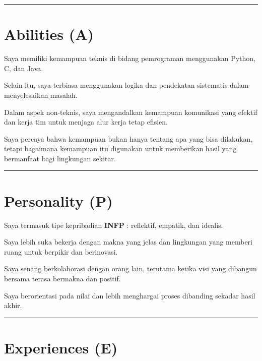 \documentclass[
  letterpaper,
  DIV=11,
  numbers=noendperiod]{scrreprt}
\begin{document}
\begin{center}\rule{0.5\linewidth}{0.5pt}\end{center}

\section*{Abilities (A)}\label{abilities-a}


Saya memiliki kemampuan teknis di bidang pemrograman menggunakan Python,
C, dan Java.

Selain itu, saya terbiasa menggunakan logika dan pendekatan sistematis
dalam menyelesaikan masalah.

Dalam aspek non-teknis, saya mengandalkan kemampuan komunikasi yang
efektif dan kerja tim untuk menjaga alur kerja tetap efisien.

Saya percaya bahwa kemampuan bukan hanya tentang apa yang bisa
dilakukan, tetapi bagaimana kemampuan itu digunakan untuk memberikan
hasil yang bermanfaat bagi lingkungan sekitar.

\begin{center}\rule{0.5\linewidth}{0.5pt}\end{center}

\section*{Personality (P)}\label{personality-p}


Saya termasuk tipe kepribadian \textbf{INFP} : reflektif, empatik, dan
idealis.

Saya lebih suka bekerja dengan makna yang jelas dan lingkungan yang
memberi ruang untuk berpikir dan berinovasi.

Saya senang berkolaborasi dengan orang lain, terutama ketika visi yang
dibangun bersama terasa bermakna dan positif.

Saya berorientasi pada nilai dan lebih menghargai proses dibanding
sekadar hasil akhir.

\begin{center}\rule{0.5\linewidth}{0.5pt}\end{center}

\section*{Experiences (E)}\label{experiences-e}
\end{document}
